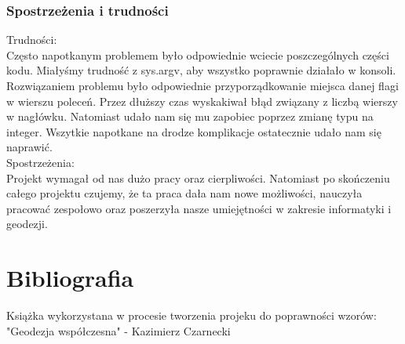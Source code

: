 \documentclass[11pt,a4paper]{article}
\begin{document}
\subsubsection{Spostrzeżenia i trudności}
Trudności:\\
Często napotkanym problemem było odpowiednie wciecie poszczególnych części kodu. Miałyśmy trudność z sys.argv, aby wszystko poprawnie działało w konsoli. Rozwiązaniem problemu było odpowiednie przyporządkowanie miejsca danej flagi w wierszu poleceń. Przez dłuższy czas wyskakiwał błąd związany z liczbą wierszy w nagłówku. Natomiast udało nam się mu zapobiec poprzez zmianę typu na integer. Wszytkie napotkane na drodze komplikacje ostatecznie udało nam się naprawić. \\
Spostrzeżenia:\\
Projekt wymagał od nas dużo pracy oraz cierpliwości. Natomiast po skończeniu całego projektu czujemy, że ta praca dała nam nowe możliwości, nauczyła pracować zespołowo oraz poszerzyła nasze umiejętności w zakresie informatyki i geodezji. 

\section {Bibliografia}
Książka wykorzystana w procesie tworzenia projeku do poprawności wzorów:\\
"Geodezja współczesna" - Kazimierz Czarnecki
\end{document}
